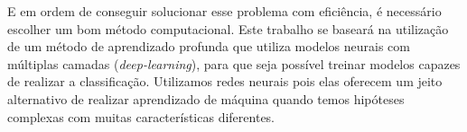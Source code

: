 E em ordem de conseguir solucionar esse problema com eficiência, é necessário escolher um bom método computacional. Este trabalho se baseará na utilização de um método de aprendizado profunda que utiliza modelos neurais com múltiplas camadas (\textit{deep-learning}), para que seja possível treinar modelos capazes de realizar a classificação. Utilizamos redes neurais pois elas oferecem um jeito alternativo de realizar aprendizado de máquina quando temos hipóteses complexas com muitas características diferentes. 

